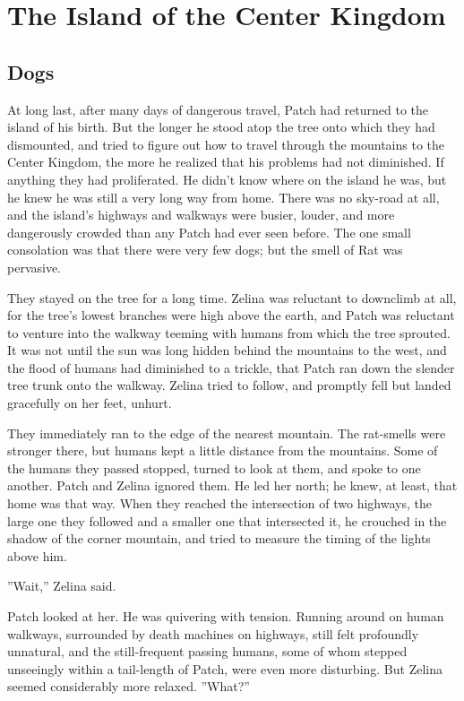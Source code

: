 \documentclass[12pt]{book}
\begin{document}
\chapter{The Island of the Center Kingdom}


\section{Dogs}

 At long last, after many days of dangerous travel, Patch had returned to the island of his birth. But the longer he stood atop the tree onto which they had dismounted, and tried to figure out how to travel through the mountains to the Center Kingdom, the more he realized that his problems had not diminished. If anything they had proliferated. He didn't know where on the island he was, but he knew he was still a very long way from home. There was no sky-road at all, and the island's highways and walkways were busier, louder, and more dangerously crowded than any Patch had ever seen before. The one small consolation was that there were very few dogs; but the smell of Rat was pervasive.\par
 They stayed on the tree for a long time. Zelina was reluctant to downclimb at all, for the tree's lowest branches were high above the earth, and Patch was reluctant to venture into the walkway teeming with humans from which the tree sprouted. It was not until the sun was long hidden behind the mountains to the west, and the flood of humans had diminished to a trickle, that Patch ran down the slender tree trunk onto the walkway. Zelina tried to follow, and promptly fell %
 but landed gracefully on her feet, unhurt.\par
 They immediately ran to the edge of the nearest mountain. The rat-smells were stronger there, but humans kept a little distance from the mountains. Some of the humans they passed stopped, turned to look at them, and spoke to one another. Patch and Zelina ignored them. He led her north; he knew, at least, that home was that way. When they reached the intersection of two highways, the large one they followed and a smaller one that intersected it, he crouched in the shadow of the corner mountain, and tried to measure the timing of the lights above him.\par
 ''Wait,'' Zelina said.\par
 Patch looked at her. He was quivering with tension. Running around on human walkways, surrounded by death machines on highways, still felt profoundly unnatural, and the still-frequent passing humans, some of whom stepped unseeingly within a tail-length of Patch, were even more disturbing. But Zelina seemed considerably more relaxed. ''What?''\par
\end{document}
